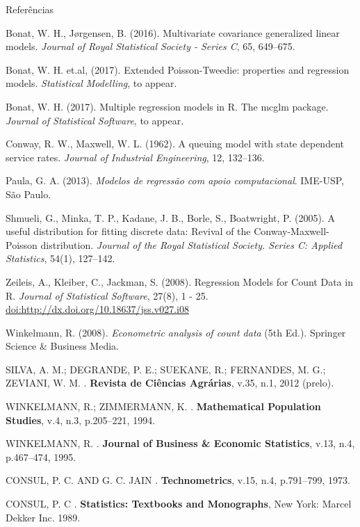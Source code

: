 \documentclass[10pt, aspectratio=169]{beamer}\usepackage[]{graphicx}\usepackage[]{color}
\begin{document}
\begin{frame}[allowframebreaks]{Referências}
\small

\begin{thebibliography}{99}
 Bonat, W. H., J{\o}rgensen, B. (2016).
Multivariate covariance generalized linear models. 
{\em Journal of Royal Statistical Society - Series C}, 65, 649–675.

 Bonat, W. H. et.al, (2017).
Extended Poisson-Tweedie: properties and regression models. 
{\em Statistical Modelling}, to appear.

 Bonat, W. H. (2017).
Multiple regression models in R. The mcglm package. 
{\em Journal of Statistical Software}, to appear.

 Conway, R. W., Maxwell, W. L. (1962).
A queuing model with state dependent service rates. {\em Journal of
Industrial Engineering}, 12, 132–136.

 Paula, G. A. (2013). {\em Modelos de regress\~ao com
apoio computacional}. IME-USP, S\~ao Paulo.

 Shmueli, G., Minka, T. P., Kadane, J. B., Borle,
S., Boatwright, P. (2005). A useful distribution for fitting discrete
data: Revival of the Conway-Maxwell-Poisson distribution. {\em Journal of
the Royal Statistical Society. Series C: Applied Statistics}, 54(1),
127–142.

 Zeileis, A., Kleiber, C., Jackman, S. (2008). 
Regression Models for Count Data in R. {\em Journal of Statistical
Software}, 27(8), 1 - 25. 
\url{doi:http://dx.doi.org/10.18637/jss.v027.i08}

 Winkelmann, R. (2008). {\em Econometric analysis
of count data} (5th Ed.). Springer Science \& Business Media.

\MakeUppercase{Silva, A. M.; Degrande, P. E.; Suekane, R.; Fernandes,
  M. G.; Zeviani, W. M.}
.
\newblock \textbf{Revista de Ciências Agrárias}, v.35, n.1, 2012 (prelo).

\MakeUppercase{Winkelmann, R.; Zimmermann, K.}
.
\newblock \textbf{Mathematical Population Studies}, v.4, n.3, p.205--221, 1994.

\MakeUppercase{Winkelmann, R.}
.
\newblock \textbf{Journal of Business \& Economic Statistics}, v.13, n.4,
  p.467--474, 1995.

\MakeUppercase{Consul, P. C. and G. C. Jain}
.
\textbf{Technometrics}, v.15, n.4, p.791--799, 1973.

\MakeUppercase{Consul, P. C}
. \textbf{Statistics: Textbooks and Monographs}, New
York: Marcel Dekker Inc. 1989.

\end{thebibliography}
\end{frame}
\end{document}
